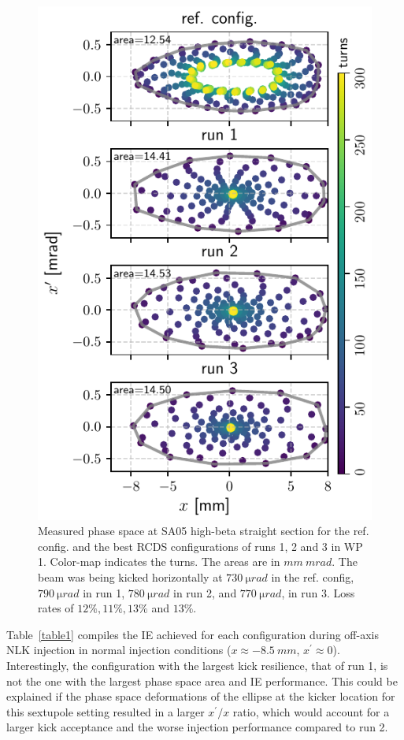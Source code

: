 \documentclass[a4paper,
               keeplastbox,   %
               ]{jacow}
\begin{document}
\begin{figure}[!h]
    \centering
    \includegraphics[width=\columnwidth]{WEPL087_f2.pdf}
    \caption{Measured phase space at SA05 high-beta straight section for the ref. config. and the best RCDS configurations of runs 1, 2 and 3 in WP 1. Color-map indicates the turns. The areas are in $\unit{mm}~\unit{mrad}$. The beam was being kicked horizontally at $730~\unit{\micro rad}$ in the ref. config, $790~\unit{\micro rad}$ in run 1, $780~\unit{\micro rad}$ in run 2, and $770~\unit{\micro rad}$, in run 3. Loss rates of  $12\%, 11\%, 13\%$ and $13\%$.} 
    \label{fig:oldtunes_phase}
\end{figure}
Table~\ref{table1} compiles the IE achieved for each configuration during off-axis NLK injection in normal injection conditions ($x\approx -8.5~\unit{mm}$, $x^\prime\approx 0 $). 
Interestingly, the configuration with the largest kick resilience, that of run 1, is not the one with the largest phase space area and IE performance. This could be explained if the phase space deformations of the ellipse at the kicker location for this sextupole setting resulted in a larger $x^\prime/x$ ratio, which would account for a larger kick acceptance and the worse injection performance compared to run 2. 
\end{document}
